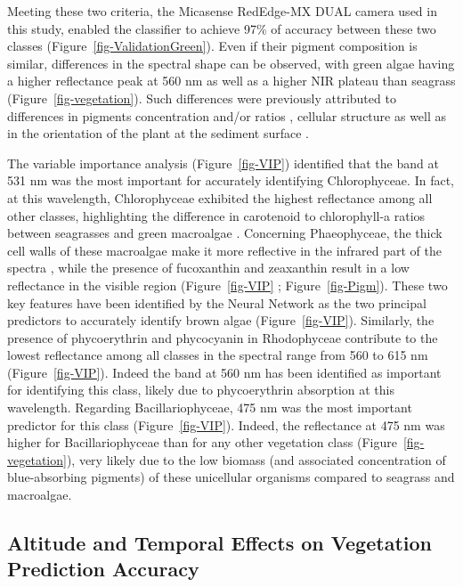 \documentclass[
  number]{elsarticle}
\begin{document}
Meeting these two criteria, the Micasense RedEdge-MX DUAL camera used in
this study, enabled the classifier to achieve 97\% of accuracy between
these two classes (Figure~\ref{fig-ValidationGreen}). Even if their
pigment composition is similar, differences in the spectral shape can be
observed, with green algae having a higher reflectance peak at 560 nm as
well as a higher NIR plateau than seagrass
(Figure~\ref{fig-vegetation}). Such differences were previously
attributed to differences in pigments concentration and/or ratios
\citep{bargain2013seasonal}, cellular structure as well as in the
orientation of the plant at the sediment surface
\citep{beach1997vivo, kirk1994light, hedley2018influence}.

The variable importance analysis (Figure~\ref{fig-VIP}) identified that
the band at 531 nm was the most important for accurately identifying
Chlorophyceae. In fact, at this wavelength, Chlorophyceae exhibited the
highest reflectance among all other classes, highlighting the difference
in carotenoid to chlorophyll-a ratios between seagrasses and green
macroalgae \citep{repolho2017seagrass}. Concerning Phaeophyceae, the
thick cell walls of these macroalgae \citep{charrier2021growth} make it
more reflective in the infrared part of the spectra \citep{Slaton2001},
while the presence of fucoxanthin and zeaxanthin result in a low
reflectance in the visible region (Figure~\ref{fig-VIP} ;
Figure~\ref{fig-Pigm}). These two key features have been identified by
the Neural Network as the two principal predictors to accurately
identify brown algae (Figure~\ref{fig-VIP}). Similarly, the presence of
phycoerythrin and phycocyanin in Rhodophyceae contribute to the lowest
reflectance among all classes in the spectral range from 560 to 615 nm
(Figure~\ref{fig-VIP}). Indeed the band at 560 nm has been identified as
important for identifying this class, likely due to phycoerythrin
absorption at this wavelength. Regarding Bacillariophyceae, 475 nm was
the most important predictor for this class (Figure~\ref{fig-VIP}).
Indeed, the reflectance at 475 nm was higher for Bacillariophyceae than
for any other vegetation class (Figure~\ref{fig-vegetation}), very
likely due to the low biomass (and associated concentration of
blue-absorbing pigments) of these unicellular organisms compared to
seagrass and macroalgae.

\subsection{Altitude and Temporal Effects on Vegetation Prediction
Accuracy}\label{altitude-and-temporal-effects-on-vegetation-prediction-accuracy}
\end{document}
